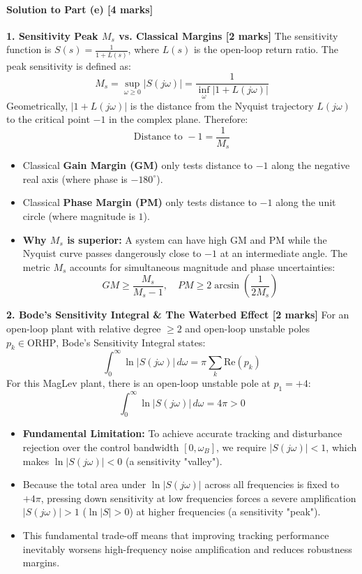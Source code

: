 \documentclass[12pt,onecolumn,twoside ]{article}
\begin{document}
	\paragraph{Solution to Part (e) [4 marks]}
	\textbf{1. Sensitivity Peak $M_s$ vs. Classical Margins [2 marks]} The sensitivity function is $S(s) = \frac{1}{1 + L(s)}$, where $L(s)$ is the open-loop return ratio. The peak sensitivity is defined as: \[
	M_s = \sup_{\omega \ge 0} |S(j\omega)| = \frac{1}{\inf_{\omega} |1 + L(j\omega)|}
	\] Geometrically, $|1 + L(j\omega)|$ is the distance from the Nyquist trajectory $L(j\omega)$ to the critical point $-1$ in the complex plane. Therefore: \[
	\text{Distance to }-1 = \frac{1}{M_s}
	\]
	\begin{itemize}
		\item
		Classical \textbf{Gain Margin (GM)} only tests distance to $-1$ along the negative real axis (where phase is $-180^\circ$).
		\item
		Classical \textbf{Phase Margin (PM)} only tests distance to $-1$ along the unit circle (where magnitude is $1$).
		\item
		\textbf{Why $M_s$ is superior:} A system can have high GM and PM while the Nyquist curve passes dangerously close to $-1$ at an intermediate angle. The metric $M_s$ accounts for simultaneous magnitude and phase uncertainties: \[
		GM \ge \frac{M_s}{M_s - 1}, \quad PM \ge 2 \arcsin\left(\frac{1}{2M_s}\right)
		\]
	\end{itemize}
	\textbf{2. Bode's Sensitivity Integral \& The Waterbed Effect [2 marks]} For an open-loop plant with relative degree $\ge 2$ and open-loop unstable poles $p_k \in \text{ORHP}$, Bode's Sensitivity Integral states: \[
	\int_{0}^{\infty} \ln |S(j\omega)|\, d\omega = \pi \sum_{k} \text{Re}(p_k)
	\] For this MagLev plant, there is an open-loop unstable pole at $p_1 = +4$: \[
	\int_{0}^{\infty} \ln |S(j\omega)|\, d\omega = 4\pi > 0
	\]
	\begin{itemize}
		\item
		\textbf{Fundamental Limitation:} To achieve accurate tracking and disturbance rejection over the control bandwidth $[0, \omega_B]$, we require $|S(j\omega)| < 1$, which makes $\ln |S(j\omega)| < 0$ (a sensitivity "valley").
		\item
		Because the total area under $\ln |S(j\omega)|$ across all frequencies is fixed to $+4\pi$, pressing down sensitivity at low frequencies forces a severe amplification $|S(j\omega)| > 1$ ($\ln |S| > 0$) at higher frequencies (a sensitivity "peak").
		\item
		This fundamental trade-off means that improving tracking performance inevitably worsens high-frequency noise amplification and reduces robustness margins.
	\end{itemize}
	
\end{document}

